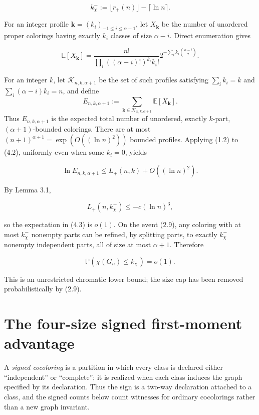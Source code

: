 \documentclass[11pt,reqno]{amsart}
\newcommand{\Prob}[1]{\mathbb{P}\!\left(#1\right)}
\newcommand{\Exp}[1]{\mathbb{E}\!\left[#1\right]}
\begin{document}
\[
 k_\chi^-:=\lfloor r_+(n)\rfloor-\lceil {\ln n}\rceil.         \tag{4.1}
\]

For an integer profile
\(\mathbf k=(k_i)_{-1\le i\le\alpha-1}\), let
\(X_{\mathbf k}\) be the number of unordered proper colorings having
exactly \(k_i\) classes of size \(\alpha-i\). Direct enumeration gives

\[
 \Exp{X_{\mathbf k}}
 =\frac{n!}{\prod_i((\alpha-i)!)^{k_i}k_i!}
  2^{-\sum_i k_i\binom{\alpha-i}{2}}.                   \tag{4.2}
\]

For an integer \(k\), let \(\mathcal K_{n,k,\alpha+1}\) be the set of
such profiles satisfying
\(\sum_i k_i=k\) and \(\sum_i(\alpha-i)k_i=n\), and define
\[
 E_{n,k,\alpha+1}
 :=\sum_{\mathbf k\in\mathcal K_{n,k,\alpha+1}}
   \Exp{X_{\mathbf k}}.
\]
Thus \(E_{n,k,\alpha+1}\) is the expected total number of unordered,
exactly \(k\)-part, \((\alpha+1)\)-bounded colorings. There are at most
\((n+1)^{\alpha+1}=\exp(O((\ln n)^2))\)
bounded profiles. Applying (1.2) to (4.2), uniformly even when some
\(k_i=0\), yields

\[
 \ln E_{n,k,\alpha+1}\le L_+(n,k)+O((\ln n)^2).                \tag{4.3}
\]

By Lemma 3.1,

\[
 L_+(n,k_\chi^-)\le-c(\ln n)^3,                                \tag{4.4}
\]

so the expectation in (4.3) is \(o(1)\). On the event (2.9), any
coloring with at most \(k_{\chi}^-\) nonempty parts can be
refined, by splitting parts, to exactly \(k_{\chi}^-\) nonempty
independent parts, all of size at most \(\alpha+1\). Therefore

\[
 \Prob{\chi(G_n)\le k_\chi^-}=o(1).                     \tag{4.5}
\]

This is an unrestricted chromatic lower bound; the size cap has been
removed probabilistically by (2.9).

\section{The four-size signed first-moment
advantage}\label{the-four-size-signed-first-moment-advantage}

A \emph{signed cocoloring} is a partition in which every class is
declared either ``independent'' or ``complete''; it is realized when each
class induces the graph specified by its declaration.  Thus the sign is a
two-way declaration attached to a class, and the signed counts below count
witnesses for ordinary cocolorings rather than a new graph invariant.
\end{document}
